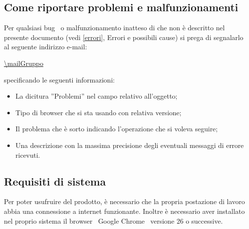 {{\begin{itemize}
{	}
\end{itemize}
}

\subsection{Come riportare problemi e malfunzionamenti}{
Per qualsiasi bug\g~ o malfunzionamento inatteso di \textbf{\mytalk} che non è descritto nel presente documento (vedi \ref{errori}, Errori e possibili cause) si prega di segnalarlo al seguente indirizzo e-mail:
\begin{center}
	\url{\mailGruppo}
\end{center}
specificando le seguenti informazioni:
\begin{itemize}
	\item La dicitura ''Problemi'' nel campo relativo all'oggetto;
	\item Tipo di browser che si sta usando con relativa versione;
	\item Il problema che è sorto indicando l'operazione che si voleva seguire;
	\item Una descrizione con la massima precisione degli eventuali messaggi di errore ricevuti.
\end{itemize}
}

\subsection{Requisiti di sistema}{
Per poter usufruire del prodotto, è necessario che la propria postazione di lavoro abbia una connessione a internet funzionante. Inoltre è necessario aver installato nel proprio sistema il browser\g~ Google Chrome\g~ versione 26 o successive.

}
	
}